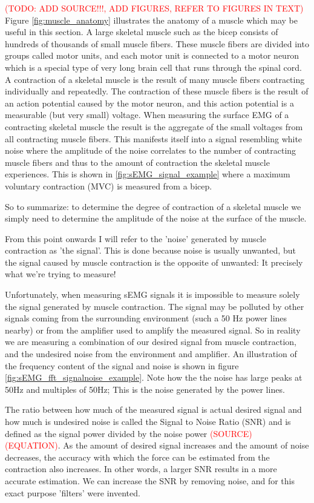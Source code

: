 \textcolor{red}{(TODO: ADD SOURCE!!!, ADD FIGURES, REFER TO FIGURES IN TEXT)}
Figure \ref{fig:muscle_anatomy} illustrates the anatomy of a muscle which may be useful in this section.
A large skeletal muscle such as the bicep consists of hundreds of thousands of small muscle fibers. These muscle fibers are divided into groups called motor units, and each motor unit is connected to a motor neuron which is a special type of very long brain cell that runs through the spinal cord. A contraction of a skeletal muscle is the result of many muscle fibers contracting individually and repeatedly. The contraction of these muscle fibers is the result of an action potential caused by the motor neuron, and this action potential is a measurable (but very small) voltage. When measuring the surface EMG of a contracting skeletal muscle the result is the aggregate of the small voltages from all contracting muscle fibers. This manifests itself into a signal resembling white noise where the amplitude of the noise correlates to the number of contracting muscle fibers and thus to the amount of contraction the skeletal muscle experiences. This is shown in \ref{fig:sEMG_signal_example} where a maximum voluntary contraction (MVC) is measured from a bicep.

So to summarize: to determine the degree of contraction of a skeletal muscle we simply need to determine the amplitude of the noise at the surface of the muscle.

From this point onwards I will refer to the 'noise' generated by muscle contraction as 'the signal'. This is done because noise is usually unwanted, but the signal caused by muscle contraction is the opposite of unwanted: It precisely what we're trying to measure! 

Unfortunately, when measuring sEMG signals it is impossible to measure solely the signal generated by muscle contraction. The signal may be polluted by other signals coming from the surrounding environment (such a 50 Hz power lines nearby) or from the amplifier used to amplify the measured signal. So in reality we are measuring a combination of our desired signal from muscle contraction, and the undesired noise from the environment and amplifier. An illustration of the frequency content of the signal and noise is shown in figure \ref{fig:sEMG_fft_signalnoise_example}. Note how the the noise has large peaks at 50Hz and multiples of 50Hz; This is the noise generated by the power lines. 

The ratio between how much of the measured signal is actual desired signal and how much is undesired noise is called the Signal to Noise Ratio (SNR) and is defined as the signal power divided by the noise power \textcolor{red}{(SOURCE) (EQUATION)}. As the amount of desired signal increases and the amount of noise decreases, the accuracy with which the force can be estimated from the contraction also increases. In other words, a larger SNR results in a more accurate estimation. We can increase the SNR by removing noise, and for this exact purpose 'filters' were invented.

